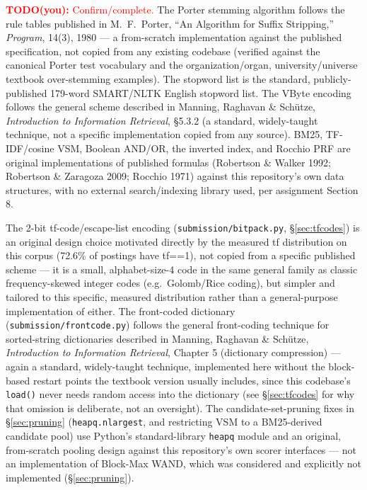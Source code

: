 \documentclass[11pt]{article}
\newcommand{\todo}[1]{\textcolor{red}{\textbf{TODO(you):} #1}}
\begin{document}
\todo{Confirm/complete.} The Porter stemming algorithm follows the rule
tables published in M.\ F.\ Porter, ``An Algorithm for Suffix Stripping,''
\emph{Program}, 14(3), 1980 --- a from-scratch implementation against the
published specification, not copied from any existing codebase (verified
against the canonical Porter test vocabulary and the
organization/organ, university/universe textbook over-stemming
examples). The stopword list is the standard, publicly-published
179-word SMART/NLTK English stopword list. The VByte encoding follows
the general scheme described in Manning, Raghavan \& Sch\"utze,
\emph{Introduction to Information Retrieval}, \S 5.3.2 (a standard,
widely-taught technique, not a specific implementation copied from any
source). BM25, TF-IDF/cosine VSM, Boolean AND/OR, the inverted index, and
Rocchio PRF are original implementations of published formulas (Robertson
\& Walker 1992; Robertson \& Zaragoza 2009; Rocchio 1971) against this
repository's own data structures, with no external search/indexing
library used, per assignment Section 8.

The 2-bit tf-code/escape-list encoding (\texttt{submission/bitpack.py},
\S\ref{sec:tfcodes}) is an original design choice motivated directly by
the measured tf distribution on this corpus (72.6\% of postings have
tf==1), not copied from a specific published scheme --- it is a small,
alphabet-size-4 code in the same general family as classic
frequency-skewed integer codes (e.g.\ Golomb/Rice coding), but simpler
and tailored to this specific, measured distribution rather than a
general-purpose implementation of either. The front-coded dictionary
(\texttt{submission/frontcode.py}) follows the general front-coding
technique for sorted-string dictionaries described in Manning, Raghavan
\& Sch\"utze, \emph{Introduction to Information Retrieval}, Chapter 5
(dictionary compression) --- again a standard, widely-taught technique,
implemented here without the block-based restart points the textbook
version usually includes, since this codebase's \texttt{load()} never
needs random access into the dictionary (see \S\ref{sec:tfcodes} for why
that omission is deliberate, not an oversight). The candidate-set-pruning
fixes in \S\ref{sec:pruning} (\texttt{heapq.nlargest}, and restricting
VSM to a BM25-derived candidate pool) use Python's standard-library
\texttt{heapq} module and an original, from-scratch pooling design
against this repository's own scorer interfaces --- not an implementation
of Block-Max WAND, which was considered and explicitly not implemented
(\S\ref{sec:pruning}).
\end{document}
